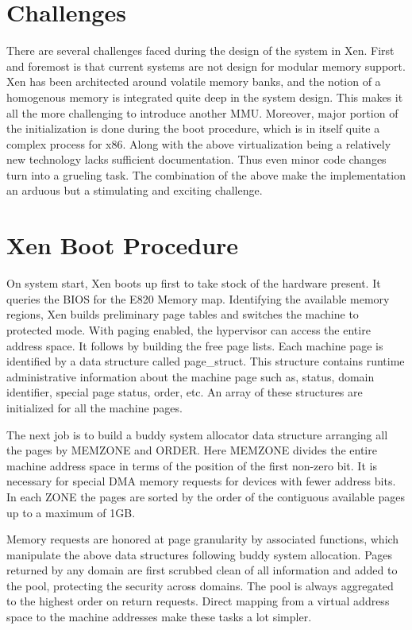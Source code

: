 \section{Challenges}

There are several challenges faced during the design of the system in Xen. First and foremost is that current systems are not design for modular memory support. Xen has been architected around volatile memory banks, and the notion of a homogenous memory is integrated quite deep in the system design. This makes it all the more challenging to introduce another MMU. Moreover, major portion of the initialization is done during the boot procedure, which is in itself quite a complex process for x86. Along with the above virtualization being a relatively new technology lacks sufficient documentation. Thus even minor code changes turn into a grueling task. The combination of the above make the implementation an arduous but a stimulating and exciting challenge. 


\section{Xen Boot Procedure}

 

On system start, Xen boots up first to take stock of the hardware present. It queries the BIOS for the E820 Memory map. Identifying the available memory regions, Xen builds preliminary page tables and switches the machine to protected mode. With paging enabled, the hypervisor can access the entire address space. It follows by building the free page lists. Each machine page is identified by a data structure called page\_struct. This structure contains runtime administrative information about the machine page such as, status, domain identifier, special page status, order, etc. An array of these structures are initialized for all the machine pages. 

 

The next job is to build a buddy system allocator data structure arranging all the pages by MEMZONE and ORDER. Here MEMZONE divides the entire machine address space in terms of the position of the first non-zero bit. It is necessary for special DMA memory requests for devices with fewer address bits. In each ZONE the pages are sorted by the order of the contiguous available pages up to a maximum of 1GB. 

 

Memory requests are honored at page granularity by associated functions, which manipulate the above data structures following buddy system allocation. Pages returned by any domain are first scrubbed clean of all information and added to the pool, protecting the security across domains. The pool is always aggregated to the highest order on return requests. Direct mapping from a virtual address space to the machine addresses make these tasks a lot simpler. 


